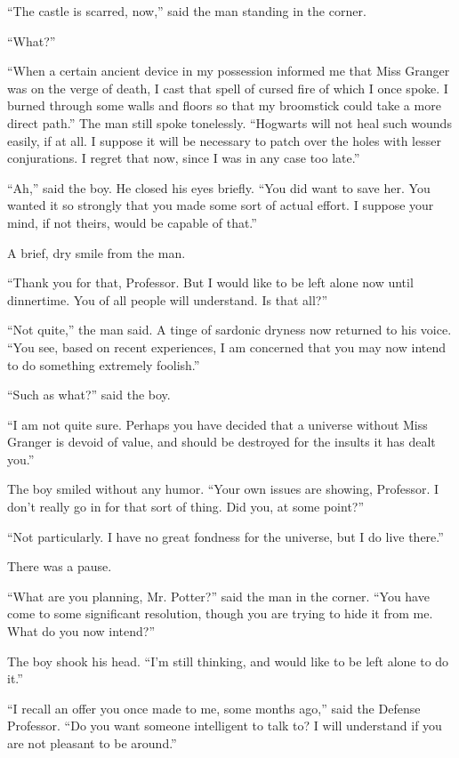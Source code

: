 ``The castle is scarred, now,'' said the man standing in the corner.

``What?''

``When a certain ancient device in my possession informed me that Miss Granger was on the verge of death, I cast that spell of cursed fire of which I once spoke. I burned through some walls and floors so that my broomstick could take a more direct path.'' The man still spoke tonelessly. ``Hogwarts will not heal such wounds easily, if at all. I suppose it will be necessary to patch over the holes with lesser conjurations. I regret that now, since I was in any case too late.''

``Ah,'' said the boy. He closed his eyes briefly. ``You did want to save her. You wanted it so strongly that you made some sort of actual effort. I suppose your mind, if not theirs, would be capable of that.''

A brief, dry smile from the man.

``Thank you for that, Professor. But I would like to be left alone now until dinnertime. You of all people will understand. Is that all?''

``Not quite,'' the man said. A tinge of sardonic dryness now returned to his voice. ``You see, based on recent experiences, I am concerned that you may now intend to do something extremely foolish.''

``Such as what?'' said the boy.

``I am not quite sure. Perhaps you have decided that a universe without Miss Granger is devoid of value, and should be destroyed for the insults it has dealt you.''

The boy smiled without any humor. ``Your own issues are showing, Professor. I don't really go in for that sort of thing. Did you, at some point?''

``Not particularly. I have no great fondness for the universe, but I do live there.''

There was a pause.

``What are you planning, Mr. Potter?'' said the man in the corner. ``You have come to some significant resolution, though you are trying to hide it from me. What do you now intend?''

The boy shook his head. ``I'm still thinking, and would like to be left alone to do it.''

``I recall an offer you once made to me, some months ago,'' said the Defense Professor. ``Do you want someone intelligent to talk to? I will understand if you are not pleasant to be around.''

